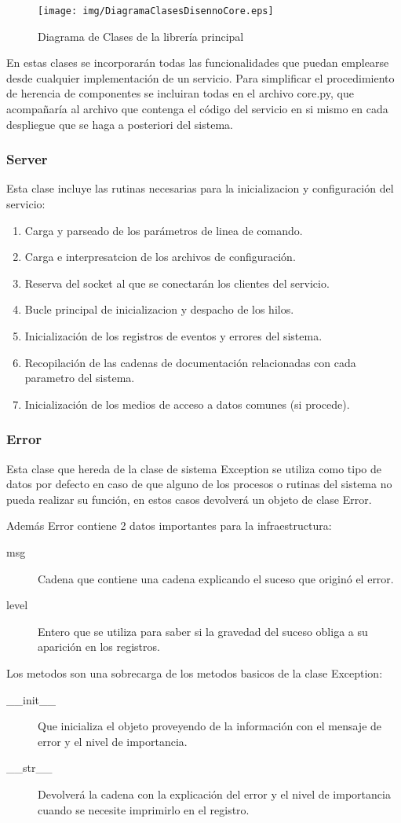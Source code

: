\documentclass[a4paper,spanish,12pt]{book}
\begin{document}
\begin{figure}[h]
	\texttt{[image: img/DiagramaClasesDisennoCore.eps]}
	\caption{Diagrama de Clases de la librería principal} 
	      \label{fig:DiagramaClasesDiseñoCore}
\end{figure}

En estas clases se incorporarán todas las funcionalidades que puedan emplearse desde cualquier implementación de un servicio. Para simplificar el procedimiento de herencia de componentes se incluiran todas en el archivo core.py, que acompañaría al archivo que contenga el código del servicio en si mismo en cada despliegue que se haga a posteriori del sistema.
\subsubsection{Server}
Esta clase incluye las rutinas necesarias para la inicializacion y configuración del servicio:
\begin{enumerate}
	\item Carga y parseado de los parámetros de linea de comando.
	\item Carga e interpresatcion de los archivos de configuración.
	\item Reserva del socket al que se conectarán los clientes del servicio.
	\item Bucle principal de inicializacion y despacho de los hilos.	
	\item Inicialización de los registros de eventos y errores del sistema.
	\item Recopilación de las cadenas de documentación relacionadas con cada parametro del sistema.
	\item Inicialización de los medios de acceso a datos comunes (si procede). 
\end{enumerate}
\subsubsection{Error}
Esta clase que hereda de la clase de sistema Exception se utiliza como tipo de datos por defecto en caso de que alguno de los procesos o rutinas del sistema no pueda realizar su función, en estos casos devolverá un objeto de clase Error.

Además Error contiene 2 datos importantes para la infraestructura:
\begin{description}
	\item[msg]Cadena que contiene una cadena explicando el suceso que originó el error.
	\item[level]Entero que se utiliza para saber si la gravedad del suceso obliga a su aparición en los registros.
\end{description}
Los metodos son una sobrecarga de los metodos basicos de la clase Exception:
\begin{description}
	\item[\_\_init\_\_]Que inicializa el objeto proveyendo de la información con el mensaje de error y el nivel de importancia.
	\item[\_\_str\_\_]Devolverá la cadena con la explicación del error y el nivel de importancia cuando se necesite imprimirlo en el registro.
\end{description}
\end{document}
